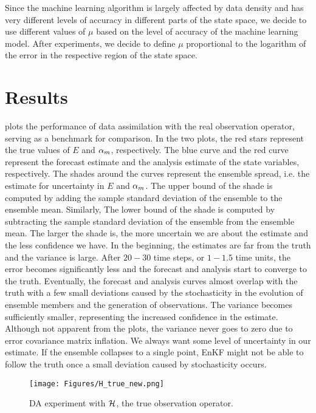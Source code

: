 \par Since the machine learning algorithm is largely affected by data density and has very different levels of accuracy in different parts of the state space, we decide to use different values of $\mu$ based on the level of accuracy of the machine learning model. After experiments, we decide to define $\mu$ proportional to the logarithm of the error in the respective region of the state space.

\section{Results}

\par {} plots the performance of data assimilation with the real observation operator, serving as a benchmark for comparison. In the two plots, the red stars represent the true values of $E$ and $\alpha_m$, respectively. The blue curve and the red curve represent the forecast estimate and the analysis estimate of the state variables, respectively. The shades around the curves represent the ensemble spread, i.e. the estimate for uncertainty in $E$ and $\alpha_m$. The upper bound of the shade is computed by adding the sample standard deviation of the ensemble to the ensemble mean. Similarly, The lower bound of the shade is computed by subtracting the sample standard deviation of the ensemble from the ensemble mean. The larger the shade is, the more uncertain we are about the estimate and the less confidence we have. In the beginning, the estimates are far from the truth and the variance is large. After $20-30$ time steps, or $1-1.5$ time units, the error becomes significantly less and the forecast and analysis start to converge to the truth. Eventually, the forecast and analysis curves almost overlap with the truth with a few small deviations caused by the stochasticity in the evolution of ensemble members and the generation of observations. The variance becomes sufficiently smaller, representing the increased confidence in the estimate. Although not apparent from the plots, the variance never goes to zero due to error covariance matrix inflation. We always want some level of uncertainty in our estimate. If the ensemble collapses to a single point, EnKF might not be able to follow the truth once a small deviation caused by stochasticity occurs.

\begin{figure}\label{fig:hDA}
\begin{center}
\texttt{[image: Figures/H\_true\_new.png]} 
\end{center}
\caption{DA experiment with $\mathcal{H}$, the true observation operator.}
\end{figure}


